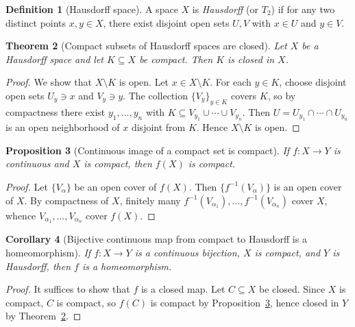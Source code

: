 \documentclass[12pt,a4paper,openany]{book}
\theoremstyle{definition}
\newtheorem{definition}{Definition}[chapter]
\theoremstyle{plain}
\newtheorem{theorem}[definition]{Theorem}
\newtheorem{proposition}[definition]{Proposition}
\newtheorem{corollary}[definition]{Corollary}
\theoremstyle{remark}
\begin{document}
\begin{definition}[Hausdorff space]\label{def:hausdorff}
A space $X$ is \emph{Hausdorff} (or $T_2$) if for any
two distinct points $x, y \in X$, there exist disjoint open sets $U, V$ with
$x \in U$ and $y \in V$.
\end{definition}

\begin{theorem}[Compact subsets of Hausdorff spaces are closed]\label{thm:compact-hausdorff-closed}
Let $X$ be a Hausdorff space and let $K \subseteq X$ be compact. Then $K$ is
closed in $X$.
\end{theorem}

\begin{proof}
We show that $X \setminus K$ is open. Let $x \in X \setminus K$. For each $y
\in K$, choose disjoint open sets $U_y \ni x$ and $V_y \ni y$. The collection
$\{V_y\}_{y \in K}$ covers $K$, so by compactness there exist $y_1, \ldots,
y_n$ with $K \subseteq V_{y_1} \cup \cdots \cup V_{y_n}$. Then $U = U_{y_1}
\cap \cdots \cap U_{y_n}$ is an open neighborhood of $x$ disjoint from $K$.
Hence $X \setminus K$ is open.
\end{proof}

\begin{proposition}[{Continuous image of a compact set is compact}]\label{prop:continuous-compact}
If $f \colon X \to Y$ is continuous and $X$ is compact, then $f(X)$ is compact.
\end{proposition}

\begin{proof}
Let $\{V_\alpha\}$ be an open cover of $f(X)$. Then $\{f^{-1}(V_\alpha)\}$ is
an open cover of $X$. By compactness of $X$, finitely many
$f^{-1}(V_{\alpha_1}), \ldots, f^{-1}(V_{\alpha_n})$ cover $X$, whence
$V_{\alpha_1}, \ldots, V_{\alpha_n}$ cover $f(X)$.
\end{proof}

\begin{corollary}[{Bijective continuous map from compact to Hausdorff is a homeomorphism}]\label{cor:compact-to-hausdorff}
If $f \colon X \to Y$ is a continuous bijection, $X$ is compact, and $Y$ is
Hausdorff, then $f$ is a homeomorphism.
\end{corollary}

\begin{proof}
It suffices to show that $f$ is a closed map. Let $C \subseteq X$ be closed.
Since $X$ is compact, $C$ is compact, so $f(C)$ is compact by
Proposition~\ref{prop:continuous-compact}, hence closed in $Y$ by
Theorem~\ref{thm:compact-hausdorff-closed}.
\end{proof}
\end{document}
